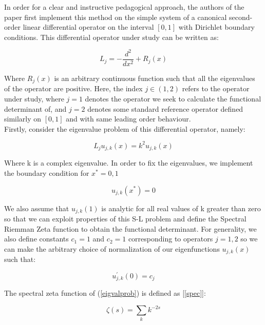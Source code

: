\documentclass[12]{article}
\begin{document}
In order for a clear and instructive pedagogical approach, the authors of the paper first implement this method on the simple system of a canonical second-order linear differential operator on the interval \([0,1]\) with Dirichlet boundary conditions. This differential operator under study can be written as: 

\begin{equation} \label{secondorderoperator}
    L_j = -\frac{d^2}{dx^2} + R_j(x)
\end{equation} 

Where \(R_j(x)\) is an arbitrary continuous function such that all the eigenvalues of the operator are positive. Here, the index \(j \in (1,2)\) refers to the operator under study, where \(j = 1\) denotes the operator we seek to calculate the functional determinant of, and \(j = 2\) denotes some standard reference operator defined similarly on \([0,1]\) and with same leading order behaviour. \\

Firstly, consider the eigenvalue problem of this differential operator, namely:

\begin{equation} \label{eigvalprob}
    L_j u_{j,k}(x) = k^2 u_{j,k}(x)
\end{equation} 

Where k is a complex eigenvalue. In order to fix the eigenvalues, we implement the boundary condition for \(x^* = 0,1\)

\begin{equation} \label{BC}
    u_{j,k}(x^*) = 0    
\end{equation} 

We also assume that \(u_{j,k}(1)\) is analytic for all real values of k greater than zero so that we can exploit properties of this S-L problem and define the Spectral Riemman Zeta function to obtain the functional determinant. For generality, we also define constants \(c_1 = 1\) and \(c_2 = 1\) corresponding to operators \(j = 1,2\) so we can make the arbitrary choice of normalization of our eigenfunctions \(u_{j,k}(x)\) such that:

\begin{equation} \label{BC2}
    u^{'}_{j,k}(0) = c_j   
\end{equation} 

The spectral zeta function of (\ref{eigvalprob}) is defined as [\ref{spec}]:

\begin{equation} \label{zetasum}
    \zeta(s) = \sum_{k} k^{-2s}
\end{equation} 
\end{document}
